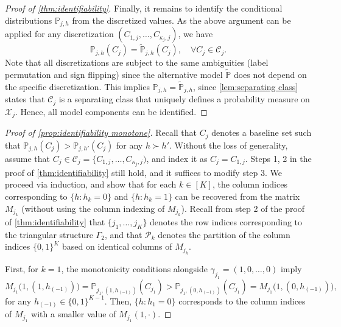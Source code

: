 \documentclass[10pt]{article} %
\newcommand{\PP}{\mathbb P}
\def\tilde{\widetilde}
\begin{document}
\begin{proof}[Proof of \cref{thm:identifiability}]
Finally, it remains to identify the conditional distributions $\PP_{j,h}$ from the discretized values. As the above argument can be applied for any discretization $(C_{1,j}, \ldots, C_{\kappa_j,j})$, we have 
$$\PP_{j,h}(C_j) = \tilde{\PP}_{j,h}(C_j), \quad \forall C_j \in \mathcal{C}_j.$$
Note that all discretizations are subject to the same ambiguities (label permutation and sign flipping) since the alternative model $\tilde{\PP}$ does not depend on the specific discretization.
This implies $\PP_{j,h} = \tilde{\PP}_{j,h}$, since \cref{lem:separating class} states that $\mathcal{C}_j$ is a separating class that uniquely defines a probability measure on $\mathcal{X}_j$. Hence, all model components can be identified.
\end{proof}

\begin{proof}[Proof of \cref{prop:identifiability monotone}]
    Recall that $C_j$ denotes a baseline set such that $\PP_{j,h}(C_j) > \PP_{j,h'}(C_j)$ for any $h \succ h'$.
    Without the loss of generality, assume that $C_j \in \mathcal{C}_j = \{C_{1,j}, \ldots, C_{\kappa_j,j})$, and index it as $C_j = C_{1,j}$.
    Steps 1, 2 in the proof of \cref{thm:identifiability} still hold, and it suffices to modify step 3. We proceed via induction, and show that for each $k \in [K]$, the column indices corresponding to $\{h: {h}_k=0\}$ and $\{h: {h}_k=1\}$ can be recovered from the matrix ${M}_{j_k}$ (without using the column indexing of $M_{j_k}$). Recall from step 2 of the proof of \cref{thm:identifiability} that $\{j_1, \ldots, j_K\}$ denotes the row indices corresponding to the triangular structure $\Gamma_2$, and that $\mathcal{P}_k$ denotes the partition of the column indices $\{0,1\}^K$ based on identical columns of $M_{j_k}$.

    First, for $k = 1$, the monotonicity conditions alongside $\gamma_{j_1} = (1, 0,\ldots, 0)$ imply 
    $${M}_{j_1}\Big(1, (1,h_{(-1)})\Big) = \PP_{{j_1},(1,h_{(-1)})}(C_{j_1}) > \PP_{{j_1},(0,h_{(-1)})}(C_{j_1}) = {M}_{j_1}\Big(1, (0,h_{(-1)})\Big),$$
    for any $h_{(-1)} \in \{0,1\}^{K-1}.$ Then, $\{h: {h}_1=0\}$ corresponds to the column indices of $M_{j_1}$ with a smaller value of $M_{j_1}(1, \cdot)$.
    

\end{proof}
\end{document}
